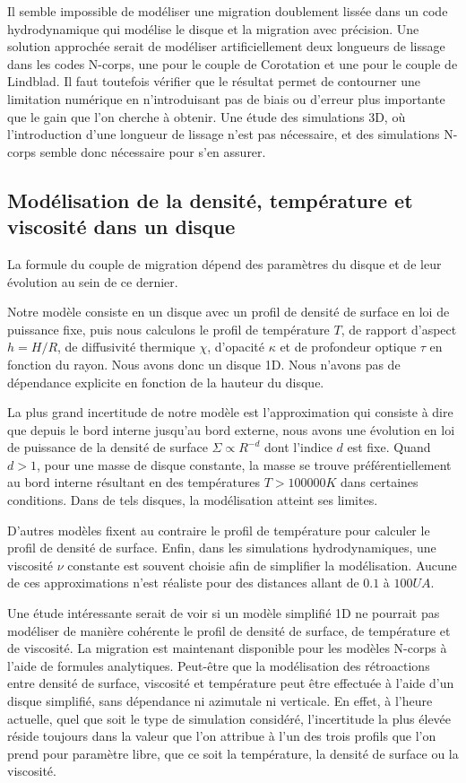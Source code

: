 Il semble impossible de modéliser une migration doublement lissée dans un code hydrodynamique qui modélise le disque et la migration avec précision. Une solution approchée serait de modéliser artificiellement deux longueurs de lissage dans les codes N-corps, une pour le couple de Corotation et une pour le couple de Lindblad. Il faut toutefois vérifier que le résultat permet de contourner une limitation numérique en n'introduisant pas de biais ou d'erreur plus importante que le gain que l'on cherche à obtenir. Une étude des simulations 3D, où l'introduction d'une longueur de lissage n'est pas nécessaire, et des simulations N-corps semble donc nécessaire pour s'en assurer. 

\subsection{Modélisation de la densité, température et viscosité dans un disque}
La formule du couple de migration dépend des paramètres du disque et de leur évolution au sein de ce dernier. 

Notre modèle consiste en un disque avec un profil de densité de surface en loi de puissance fixe, puis nous calculons le profil de température $T$, de rapport d'aspect $h=H/R$, de diffusivité thermique $\chi$, d'opacité $\kappa$ et de profondeur optique $\tau$ en fonction du rayon. Nous avons donc un disque 1D. Nous n'avons pas de dépendance explicite en fonction de la hauteur du disque. 

La plus grand incertitude de notre modèle est l'approximation qui consiste à dire que depuis le bord interne jusqu'au bord externe, nous avons une évolution en loi de puissance de la densité de surface $\Sigma\propto R^{-d}$ dont l'indice $d$ est fixe. Quand $d>1$, pour une masse de disque constante, la masse se trouve préférentiellement au bord interne résultant en des températures $T>100 000\unit{K}$ dans certaines conditions. Dans de tels disques, la modélisation atteint ses limites.

D'autres modèles fixent au contraire le profil de température pour calculer le profil de densité de surface. Enfin, dans les simulations hydrodynamiques, une viscosité $\nu$ constante est souvent choisie afin de simplifier la modélisation. Aucune de ces approximations n'est réaliste pour des distances allant de $0.1$ à $100\unit{UA}$. 

Une étude intéressante serait de voir si un modèle simplifié 1D ne pourrait pas modéliser de manière cohérente le profil de densité de surface, de température et de viscosité. La migration est maintenant disponible pour les modèles N-corps à l'aide de formules analytiques. Peut-être que la modélisation des rétroactions entre densité de surface, viscosité et température peut être effectuée à l'aide d'un disque simplifié, sans dépendance ni azimutale ni verticale. En effet, à l'heure actuelle, quel que soit le type de simulation considéré, l'incertitude la plus élevée réside toujours dans la valeur que l'on attribue à l'un des trois profils que l'on prend pour paramètre libre, que ce soit la température, la densité de surface ou la viscosité.

